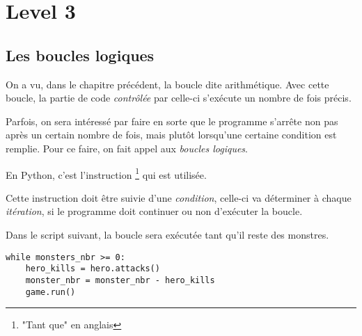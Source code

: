 




\chapter{Level 3}

\section{Les boucles logiques}

On a vu, dans le chapitre précédent, la boucle dite arithmétique. Avec cette boucle, la partie de code \emph{contrôlée} par celle-ci s'exécute un nombre de fois précis.

Parfois, on sera intéressé par faire en sorte que le programme s'arrête non pas après un certain nombre de fois, mais plutôt lorsqu'une certaine condition est remplie. Pour ce faire, on fait appel aux \emph{boucles logiques}.

En Python, c'est l'instruction \footnote{"Tant que" en anglais} qui est utilisée.

Cette instruction doit être suivie d'une \emph{condition}, celle-ci va déterminer à chaque \emph{itération}, si le programme doit continuer ou non d'exécuter la boucle.

Dans le script suivant, la boucle sera exécutée tant qu'il reste des monstres.

\begin{lstlisting}
while monsters_nbr >= 0:
	hero_kills = hero.attacks()
	monster_nbr = monster_nbr - hero_kills
	game.run()
\end{lstlisting}

